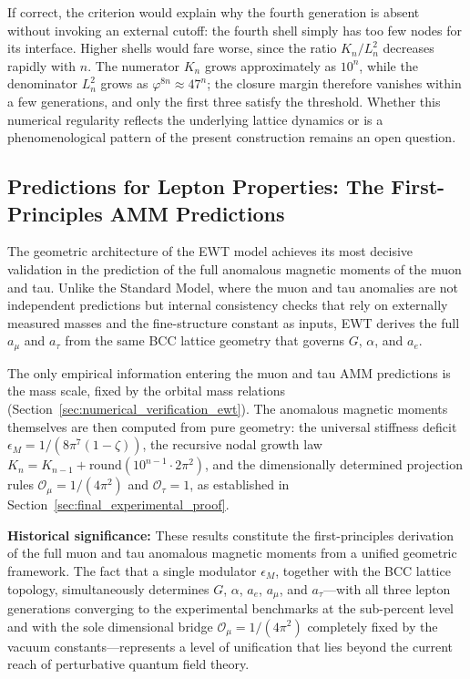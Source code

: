 \documentclass[10pt,a4paper]{article}
\begin{document}
If correct, the criterion would explain why the fourth generation is
absent without invoking an external cutoff: the fourth shell simply has
too few nodes for its interface. Higher shells would fare worse, since
the ratio $K_n/L_n^2$ decreases rapidly with $n$. The numerator $K_n$
grows approximately as $10^n$, while the denominator $L_n^2$ grows as
$\varphi^{8n} \approx 47^n$; the closure margin therefore vanishes
within a few generations, and only the first three satisfy the
threshold. Whether this numerical regularity reflects the underlying
lattice dynamics or is a phenomenological pattern of the present
construction remains an open question.

\subsection{Predictions for Lepton Properties: The First-Principles AMM Predictions}
\label{sec:lepton_predictions_pp}

The geometric architecture of the EWT model achieves its most decisive 
validation in the prediction of the full anomalous magnetic moments of the 
muon and tau. Unlike the Standard Model, where the muon and tau anomalies 
are not independent predictions but internal consistency checks that rely 
on externally measured masses and the fine-structure constant as inputs, 
EWT derives the full $a_\mu$ and $a_\tau$ from the same BCC lattice geometry 
that governs $G$, $\alpha$, and $a_e$.

The only empirical information entering the muon and tau AMM predictions is 
the mass scale, fixed by the orbital mass relations 
(Section~\ref{sec:numerical_verification_ewt}). The anomalous magnetic 
moments themselves are then computed from pure geometry: the universal 
stiffness deficit $\epsilon_M = 1/(8\pi^7(1-\zeta))$, the recursive nodal growth law 
$K_n = K_{n-1} + \text{round}(10^{n-1} \cdot 2\pi^2)$, and the dimensionally 
determined projection rules $\mathcal{O}_\mu = 1/(4\pi^2)$ and 
$\mathcal{O}_\tau = 1$, as established in 
Section~\ref{sec:final_experimental_proof}.

\textbf{Historical significance:} 
These results constitute the first-principles derivation of the full muon 
and tau anomalous magnetic moments from a unified geometric framework. The 
fact that a single modulator $\epsilon_M$, together with the BCC lattice 
topology, simultaneously determines $G$, $\alpha$, $a_e$, $a_\mu$, and 
$a_\tau$---with all three lepton generations converging to the experimental 
benchmarks at the sub-percent level and with the sole dimensional 
bridge $\mathcal{O}_\mu = 1/(4\pi^2)$ completely fixed by the vacuum 
constants---represents a level of unification that lies beyond the current 
reach of perturbative quantum field theory.
\end{document}
